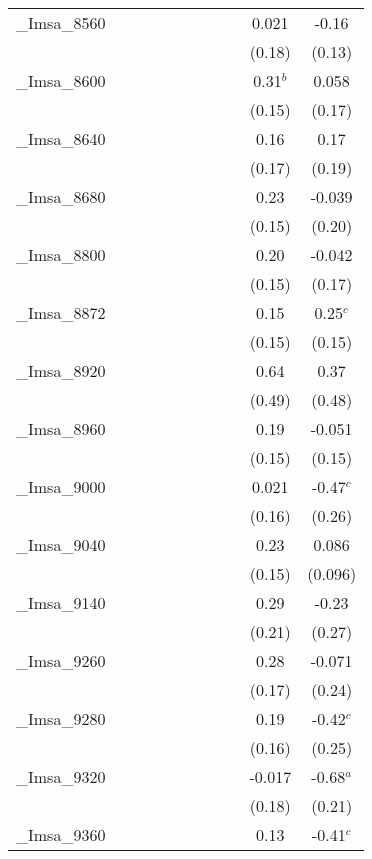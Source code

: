 \documentclass[]{article}
\begin{document}
\begin{tabular}{lcccccccccc}
\_Imsa\_8560 &  &  &  &  &  &  &  &  & 0.021 & -0.16 \\
 &  &  &  &  &  &  &  &  & (0.18) & (0.13) \\
\_Imsa\_8600 &  &  &  &  &  &  &  &  & 0.31$^b$ & 0.058 \\
 &  &  &  &  &  &  &  &  & (0.15) & (0.17) \\
\_Imsa\_8640 &  &  &  &  &  &  &  &  & 0.16 & 0.17 \\
 &  &  &  &  &  &  &  &  & (0.17) & (0.19) \\
\_Imsa\_8680 &  &  &  &  &  &  &  &  & 0.23 & -0.039 \\
 &  &  &  &  &  &  &  &  & (0.15) & (0.20) \\
\_Imsa\_8800 &  &  &  &  &  &  &  &  & 0.20 & -0.042 \\
 &  &  &  &  &  &  &  &  & (0.15) & (0.17) \\
\_Imsa\_8872 &  &  &  &  &  &  &  &  & 0.15 & 0.25$^c$ \\
 &  &  &  &  &  &  &  &  & (0.15) & (0.15) \\
\_Imsa\_8920 &  &  &  &  &  &  &  &  & 0.64 & 0.37 \\
 &  &  &  &  &  &  &  &  & (0.49) & (0.48) \\
\_Imsa\_8960 &  &  &  &  &  &  &  &  & 0.19 & -0.051 \\
 &  &  &  &  &  &  &  &  & (0.15) & (0.15) \\
\_Imsa\_9000 &  &  &  &  &  &  &  &  & 0.021 & -0.47$^c$ \\
 &  &  &  &  &  &  &  &  & (0.16) & (0.26) \\
\_Imsa\_9040 &  &  &  &  &  &  &  &  & 0.23 & 0.086 \\
 &  &  &  &  &  &  &  &  & (0.15) & (0.096) \\
\_Imsa\_9140 &  &  &  &  &  &  &  &  & 0.29 & -0.23 \\
 &  &  &  &  &  &  &  &  & (0.21) & (0.27) \\
\_Imsa\_9260 &  &  &  &  &  &  &  &  & 0.28 & -0.071 \\
 &  &  &  &  &  &  &  &  & (0.17) & (0.24) \\
\_Imsa\_9280 &  &  &  &  &  &  &  &  & 0.19 & -0.42$^c$ \\
 &  &  &  &  &  &  &  &  & (0.16) & (0.25) \\
\_Imsa\_9320 &  &  &  &  &  &  &  &  & -0.017 & -0.68$^a$ \\
 &  &  &  &  &  &  &  &  & (0.18) & (0.21) \\
\_Imsa\_9360 &  &  &  &  &  &  &  &  & 0.13 & -0.41$^c$ \\

\end{tabular}
\end{document}
